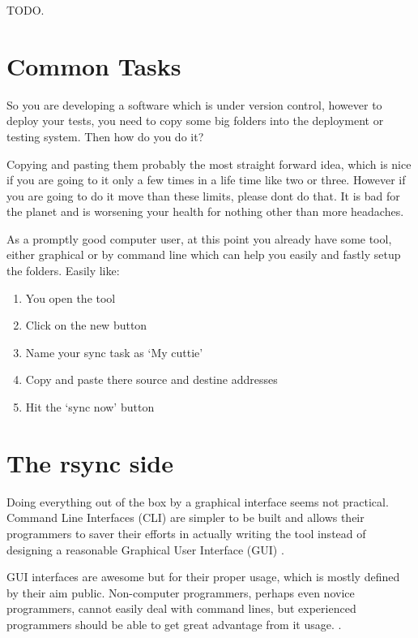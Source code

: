 \begin{englishtext}
    TODO.



    \section{Common Tasks}

    So you are developing a software which is under version control, however to
    deploy your tests, you need to copy some big folders into the deployment or
    testing system. Then how do you do it?

    Copying and pasting them probably the most straight forward idea, which is
    nice if you are going to it only a few times in a life time like two or
    three. However if you are going to do it move than these limits,
    please don\q t do that. It is bad for the planet and is worsening your
    health for nothing other than more headaches.

    As a promptly good computer user, at this point you already have some tool,
    either graphical or by command line which can help you easily and fastly
    setup the folder\q s. Easily like:

    \begin{enumerate}
        \item You open the tool
        \item Click on the new button
        \item Name your sync task as `My cuttie'
        \item Copy and paste there source and destine addresses
        \item Hit the `sync now' button
    \end{enumerate}



    \section{The rsync side}

    Doing everything out of the box by a graphical interface seems not
    practical. Command Line Interfaces (CLI) are simpler to be built and allows
    their programmers to saver their efforts in actually writing the tool
    instead of designing a reasonable Graphical User Interface (GUI)
    \cite{quantificationOfInterface}.

    GUI interfaces are awesome but for their proper usage, which is mostly
    defined by their aim public. Non-computer programmers, perhaps even novice
    programmers, cannot easily deal with command lines, but experienced
    programmers should be able to get great advantage from it usage.
    \cite{commandLineInterface}.


\end{englishtext}
